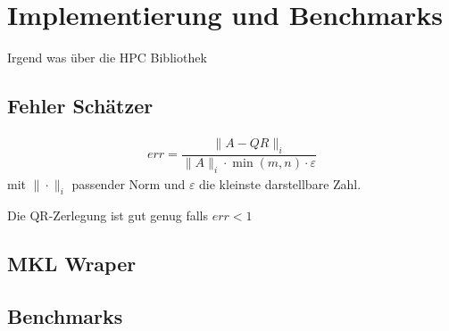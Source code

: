 \chapter{Implementierung und Benchmarks}
Irgend was über die HPC Bibliothek

\section{Fehler Schätzer}
\begin{align}
	err = \dfrac{\|A - QR\|_i}{\|A\|_i \cdot \min(m,n) \cdot \varepsilon}
\end{align}
mit $\|\cdot\|_i$ passender Norm und $\varepsilon$ die kleinste darstellbare Zahl.

Die QR-Zerlegung ist gut genug falls $ err < 1 $
\section{MKL Wraper}

\section{Benchmarks}
